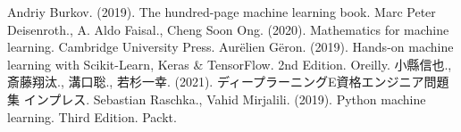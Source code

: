 \documentclass{jsarticle}
\theoremstyle{definition}
\begin{document}
\begin{thebibliography}{99}
 Andriy Burkov. (2019). The hundred-page machine learning book.
 Marc Peter Deisenroth., A. Aldo Faisal., Cheng Soon Ong. (2020). Mathematics for machine learning. Cambridge University Press.
 Aur\"{e}lien G\"{e}ron. (2019). Hands-on machine learning with Scikit-Learn, Keras \&  TensorFlow. 2nd Edition. Oreilly.
 小縣信也., 斎藤翔汰., 溝口聡., 若杉一幸. (2021). ディープラーニングE資格エンジニア問題集 インプレス.
 Sebastian Raschka., Vahid Mirjalili. (2019). Python machine learning. Third Edition. Packt.

\end{thebibliography}
\end{document}
